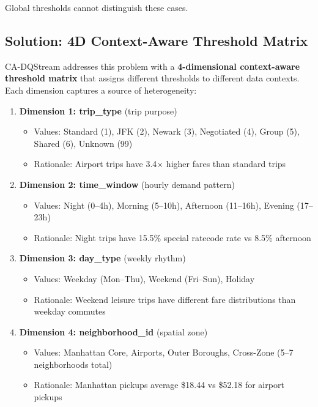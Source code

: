 Global thresholds cannot distinguish these cases.

\subsection{Solution: 4D Context-Aware Threshold Matrix}

CA-DQStream addresses this problem with a \textbf{4-dimensional context-aware threshold matrix} that assigns different thresholds to different data contexts. Each dimension captures a source of heterogeneity:

\begin{enumerate}
    \item \textbf{Dimension 1: trip\_type} (trip purpose)
        \begin{itemize}
            \item Values: Standard (1), JFK (2), Newark (3), Negotiated (4), Group (5), Shared (6), Unknown (99)
            \item Rationale: Airport trips have 3.4$\times$ higher fares than standard trips
        \end{itemize}

    \item \textbf{Dimension 2: time\_window} (hourly demand pattern)
        \begin{itemize}
            \item Values: Night (0--4h), Morning (5--10h), Afternoon (11--16h), Evening (17--23h)
            \item Rationale: Night trips have 15.5\% special ratecode rate vs 8.5\% afternoon
        \end{itemize}

    \item \textbf{Dimension 3: day\_type} (weekly rhythm)
        \begin{itemize}
            \item Values: Weekday (Mon--Thu), Weekend (Fri--Sun), Holiday
            \item Rationale: Weekend leisure trips have different fare distributions than weekday commutes
        \end{itemize}

    \item \textbf{Dimension 4: neighborhood\_id} (spatial zone)
        \begin{itemize}
            \item Values: Manhattan Core, Airports, Outer Boroughs, Cross-Zone (5--7 neighborhoods total)
            \item Rationale: Manhattan pickups average \$18.44 vs \$52.18 for airport pickups
        \end{itemize}
\end{enumerate}

